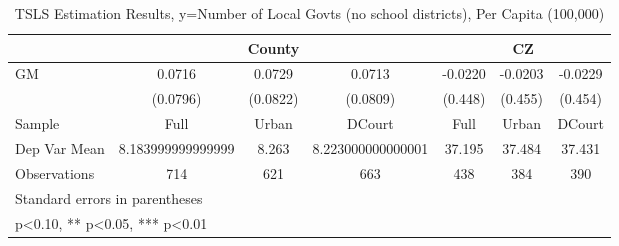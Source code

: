 \begin{table}[htbp]\centering
\def\sym#1{\ifmmode^{#1}\else\(^{#1}\)\fi}
\caption{TSLS Estimation Results, y=Number of Local Govts (no school districts), Per Capita (100,000)}
\begin{tabular}{l*{6}{c}}
\toprule
                &\multicolumn{3}{c}{County}            &\multicolumn{3}{c}{CZ}                \\\cmidrule(lr){2-4}\cmidrule(lr){5-7}
\midrule
GM              &   0.0716   &   0.0729   &   0.0713   &  -0.0220   &  -0.0203   &  -0.0229   \\
                & (0.0796)   & (0.0822)   & (0.0809)   &  (0.448)   &  (0.455)   &  (0.454)   \\
\midrule
Sample          &     Full   &    Urban   &   DCourt   &     Full   &    Urban   &   DCourt   \\
Dep Var Mean    &8.183999999999999   &    8.263   &8.223000000000001   &   37.195   &   37.484   &   37.431   \\
Observations    &      714   &      621   &      663   &      438   &      384   &      390   \\
\bottomrule
\multicolumn{7}{l}{\footnotesize Standard errors in parentheses}\\
\multicolumn{7}{l}{\footnotesize * p<0.10, ** p<0.05, *** p<0.01}\\
\end{tabular}
\end{table}
